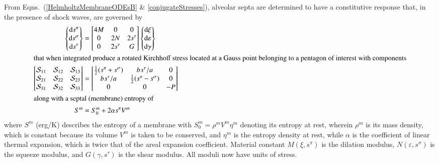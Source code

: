 From Eqns.~(\ref{HelmholtzMembraneODEsB} \& \ref{conjugateStresses}), alveolar septa are determined to have a constitutive response that, in the presence of shock waves, are governed by
\begin{subequations}
    \begin{align}
\left\{ \begin{matrix}
\mathrm{d} s^{\pi} \\ \mathrm{d} s^{\sigma} \\ \mathrm{d} s^{\tau}
\end{matrix} \right\} & = \begin{bmatrix}
4 M & 0 & 0 \\
0 & 2 N & 2 s^{\tau} \\
0 & 2 s^{\tau} & G
\end{bmatrix} \left\{ \begin{matrix}
\mathrm{d} \xi \\ \mathrm{d} \varepsilon \\ \mathrm{d} \gamma
\end{matrix} \right\} \\
\intertext{that when integrated produce a rotated Kirchhoff stress located at a Gauss point belonging to a pentagon of interest with components}
\begin{bmatrix} 
\mathcal{S}_{11} & \mathcal{S}_{12} & \mathcal{S}_{13} \\
\mathcal{S}_{21} & \mathcal{S}_{22} & \mathcal{S}_{23} \\
\mathcal{S}_{31} & \mathcal{S}_{32} & \mathcal{S}_{33}
\end{bmatrix} & = \begin{bmatrix}
\tfrac{1}{2} ( s^{\pi} + s^{\sigma} ) & b \hspace{0.5pt} s^{\tau} / a & 0 \\
b \hspace{0.5pt} s^{\tau} / a & \tfrac{1}{2} ( s^{\pi} - s^{\sigma} ) & 0 \\
0 & 0 & -P
\end{bmatrix} \label{septalStresses} \\
\intertext{along with a septal (membrane) entropy of}
S^m & = S^m_0 + 2 \alpha s^{\pi} V^m
\end{align}
\end{subequations}
where $S^m$ (erg/K) describes the entropy of a membrane with $S_0^m = \rho^m V^m \eta^m$ denoting its entropy at rest, wherein $\rho^m$ is its mass density, which is constant because its volume $V^m$ is taken to be conserved, and $\eta^m$ is the entropy density at rest, while $\alpha$ is the coefficient of linear thermal expansion, which is twice that of the areal expansion coefficient.  Material constant $M(\xi, s^{\pi})$ is the dilation modulus, $N(\varepsilon, s^{\sigma})$ is the squeeze modulus, and $G(\gamma, s^{\tau})$ is the shear modulus.  All moduli now have units of stress.

